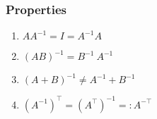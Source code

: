 \subsubsection{Properties}

\begin{multicols}{2}
\begin{enumerate}
    \item $AA^{-1} = I = A^{-1}A$
    \hfill \cite{mfml/book/mml/Deisenroth-Faisal-Ong}

    \item $(AB)^{-1} = B^{-1}\ A^{-1}$
    \hfill \cite{mfml/book/mml/Deisenroth-Faisal-Ong}

    \item $(A + B)^{-1} \neq A^{-1} + B^{-1}$
    \hfill \cite{mfml/book/mml/Deisenroth-Faisal-Ong}

    \item $(A^{-1})^\top = (A^\top)^{-1} =: A^{-\top}$
    \hfill \cite{mfml/book/mml/Deisenroth-Faisal-Ong}
    
\end{enumerate}
\end{multicols}


